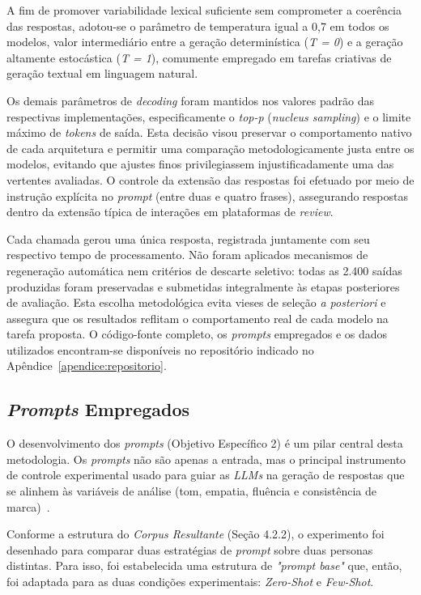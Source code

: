 \documentclass[12pt, a4paper]{article}
\numberwithin{equation}{section}
\begin{document}
A fim de promover variabilidade lexical suficiente sem comprometer a coerência das respostas, adotou-se o parâmetro de temperatura igual a 0{,}7 em todos os modelos, valor intermediário entre a geração determinística (\textit{T = 0}) e a geração altamente estocástica (\textit{T = 1}), comumente empregado em tarefas criativas de geração textual em linguagem natural\cite{holtzman2020, peeperkorn2024, renze2024}.
 
 Os demais parâmetros de \textit{decoding} foram mantidos nos valores padrão das respectivas 
implementações, especificamente o \textit{top-p} (\textit{nucleus sampling}) e o limite máximo de 
\textit{tokens} de saída. Esta decisão visou preservar o comportamento nativo de cada arquitetura 
e permitir uma comparação metodologicamente justa entre os modelos, evitando que ajustes finos 
privilegiassem injustificadamente uma das vertentes avaliadas. O controle da extensão das 
respostas foi efetuado por meio de instrução explícita no \textit{prompt} (entre duas e quatro 
frases), assegurando respostas dentro da extensão típica de interações em plataformas de 
\textit{review}.
 
 Cada chamada gerou uma única resposta, registrada juntamente com seu respectivo tempo de 
processamento. Não foram aplicados mecanismos de regeneração automática nem critérios de descarte 
seletivo: todas as 2.400 saídas produzidas foram preservadas e submetidas integralmente às etapas 
posteriores de avaliação. Esta escolha metodológica evita vieses de seleção \textit{a posteriori} 
e assegura que os resultados reflitam o comportamento real de cada modelo na tarefa proposta. O 
código-fonte completo, os \textit{prompts} empregados e os dados utilizados encontram-se 
disponíveis no repositório indicado no Apêndice~\ref{apendice:repositorio}.

\subsection{\textit{Prompts} Empregados}
\label{subsec:prompts_empregados}

O desenvolvimento dos \textit{prompts} (Objetivo Específico 2) é um pilar central desta metodologia. Os \textit{prompts} não são apenas a entrada, mas o principal instrumento de controle experimental usado para guiar as \textit{LLMs} na geração de respostas que se alinhem às variáveis de análise (tom, empatia, fluência e consistência de marca)~\cite{mello2024prompt}.

Conforme a estrutura do \textit{Corpus Resultante} (Seção 4.2.2), o experimento foi desenhado para comparar duas estratégias de \textit{prompt} sobre duas personas distintas. Para isso, foi estabelecida uma estrutura de \textit{"prompt base"} que, então, foi adaptada para as duas condições experimentais: \textit{Zero-Shot} e \textit{Few-Shot}.
\end{document}
